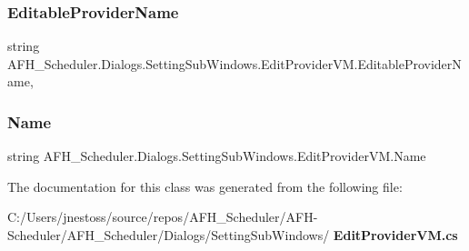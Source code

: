 \subsubsection{EditableProviderName}
{\footnotesize\ttfamily string A\+F\+H\+\_\+\+Scheduler.\+Dialogs.\+Setting\+Sub\+Windows.\+Edit\+Provider\+V\+M.\+Editable\+Provider\+Name\hspace{0.3cm}{\ttfamily [get]}, {\ttfamily [set]}}

\mbox{\label{class_a_f_h___scheduler_1_1_dialogs_1_1_setting_sub_windows_1_1_edit_provider_v_m_acd99d019235ec5613cb436413a1c26b1}} 
\subsubsection{Name}
{\footnotesize\ttfamily string A\+F\+H\+\_\+\+Scheduler.\+Dialogs.\+Setting\+Sub\+Windows.\+Edit\+Provider\+V\+M.\+Name\hspace{0.3cm}{\ttfamily [get]}}



The documentation for this class was generated from the following file\+:\begin{DoxyCompactItemize}
\item 
C\+:/\+Users/jnestoss/source/repos/\+A\+F\+H\+\_\+\+Scheduler/\+A\+F\+H-\/\+Scheduler/\+A\+F\+H\+\_\+\+Scheduler/\+Dialogs/\+Setting\+Sub\+Windows/\textbf{ Edit\+Provider\+V\+M.\+cs}\end{DoxyCompactItemize}

